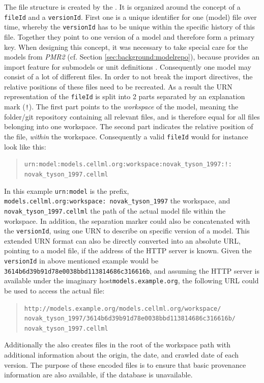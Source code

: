 The file structure is created by the \modelcrawler. It is organized around the concept of a \texttt{fileId} and a \texttt{versionId}. First one is a unique identifier for one (model) file over time, whereby the \texttt{versionId} has to be unique within the specific history of this file. Together they point to one version of a model and therefore form a primary key.
When designing this concept, it was necessary to take special care for the \cellml models from \emph{PMR2} (cf. Section \ref{sec:background:modelrepo}), because \cellml provides an import feature for submodels or unit definitions \cite{Cuellar2003}. Consequently one model may consist of a lot of different files. In order to not break the import directives, the relative positions of these files need to be recreated. As a result the URN representation of the \texttt{fileId} is split into 2 parts separated by an explanation mark (\texttt{!}). The first part points to the \emph{workspace} of the model, meaning the folder/git repository containing all relevant files, and is therefore equal for all files belonging into one workspace. The second part indicates the relative position of the file, \emph{within} the workspace.
Consequently a valid \texttt{fileId} would for instance look like this:
\begin{quote}
	\texttt{urn:model:models.cellml.org:workspace:novak\_tyson\_1997:!:\linebreak
	novak\_tyson\_1997.cellml}
\end{quote}
In this example \texttt{urn:model} is the prefix, \texttt{models.cellml.org:workspace:\ novak\_tyson\_1997} the workspace, and \texttt{novak\_tyson\_1997.cellml} the path of the actual model file within the workspace. In addition, the separation marker could also be concatenated with the \texttt{versionId}, using one URN to describe on specific version of a model. This extended URN format can also be directly converted into an absolute URL, pointing to a model file, if the address of the HTTP server is known.
Given the \texttt{versionId} in above mentioned example would be \texttt{3614b6d39b91d78e0038bbd113814686c316616b}, and assuming the HTTP server is available under the imaginary host\linebreak[4] \texttt{models.example.org}, the following URL could be used to access the actual file:
\begin{quote}
	\texttt{http://models.example.org/models.cellml.org/workspace/
		novak\_tyson\_1997/3614b6d39b91d78e0038bbd113814686c316616b/
		novak\_tyson\_1997.cellml}
\end{quote}

Additionally the \modelcrawler also creates files in the root of the workspace path with additional information about the origin, the date, and crawled date of each version.
The purpose of these \json encoded files is to ensure that basic provenance information are also available, if the \masymos database is unavailable.

